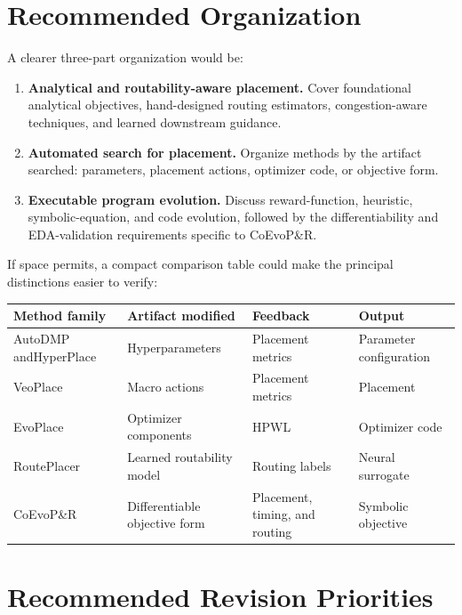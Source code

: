 \documentclass[11pt]{article}
\begin{document}
\section{Recommended Organization}

A clearer three-part organization would be:

\begin{enumerate}
  \item \textbf{Analytical and routability-aware placement.} Cover
  foundational analytical objectives, hand-designed routing estimators,
  congestion-aware techniques, and learned downstream guidance.

  \item \textbf{Automated search for placement.} Organize methods by the
  artifact searched: parameters, placement actions, optimizer code, or
  objective form.

  \item \textbf{Executable program evolution.} Discuss reward-function,
  heuristic, symbolic-equation, and code evolution, followed by the
  differentiability and EDA-validation requirements specific to CoEvoP\&R.
\end{enumerate}

If space permits, a compact comparison table could make the principal
distinctions easier to verify:

\begin{center}
\small
\begin{tabular}{|p{}|p{}|p{}|p{}|}
\hline
\textbf{Method family} & \textbf{Artifact modified} & \textbf{Feedback} &
\textbf{Output} \\
\hline
AutoDMP and\newline HyperPlace & Hyperparameters & Placement metrics & Parameter
configuration \\
\hline
VeoPlace & Macro actions & Placement metrics & Placement \\
\hline
EvoPlace & Optimizer components & HPWL & Optimizer code \\
\hline
RoutePlacer & Learned routability model & Routing labels & Neural surrogate \\
\hline
CoEvoP\&R & Differentiable objective form & Placement, timing, and routing &
Symbolic objective \\
\hline
\end{tabular}
\end{center}

\section{Recommended Revision Priorities}
\end{document}

